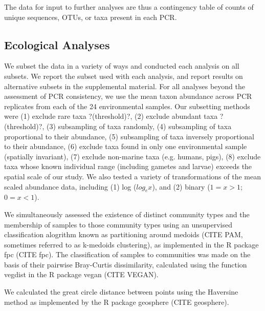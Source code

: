 \documentclass[11pt,letterpaper]{article} %
\begin{document}
The data for input to further analyses are thus a contingency table of counts of unique sequences, OTUs, or taxa present in each PCR.



\subsection*{Ecological Analyses}

We subset the data in a variety of ways and conducted each analysis on all subsets.
We report the subset used with each analysis, and report results on alternative subsets in the supplemental material.
For all analyses beyond the assessment of PCR consistency, we use the mean taxon abundance across PCR replicates from each of the 24 environmental samples.
Our subsetting methods were (1) exclude rare taxa ?(threshold)?, (2) exclude abundant taxa ?(threshold)?, (3) subsampling of taxa randomly, (4) subsampling of taxa proportional to their abundance, (5) subsampling of taxa inversely proportional to their abundance, (6) exclude taxa found in only one environmental sample (spatially invariant), (7) exclude non-marine taxa (e.g. humans, pigs), (8) exclude taxa whose known individual range (including gametes and larvae) exceeds the spatial scale of our study.
We also tested a variety of transformations of the mean scaled abundance data, including (1) log ($log_{e}x$), and (2) binary ($1 = x > 1$; $0 = x < 1$).

We simultaneously assessed the existence of distinct community types and the membership of samples to those community types using an unsupervised classification alogrithm known as partitioning around medoids (CITE PAM, sometimes referred to as k-medoids clustering), as implemented in the R package fpc (CITE fpc).
The classification of samples to communities was made on the basis of their pairwise Bray-Curtis dissimilarity, calculated using the function vegdist in the R package vegan (CITE VEGAN). %

We calculated the great circle distance between points using the Haversine method as implemented by the R package geosphere (CITE geosphere).
\end{document}
